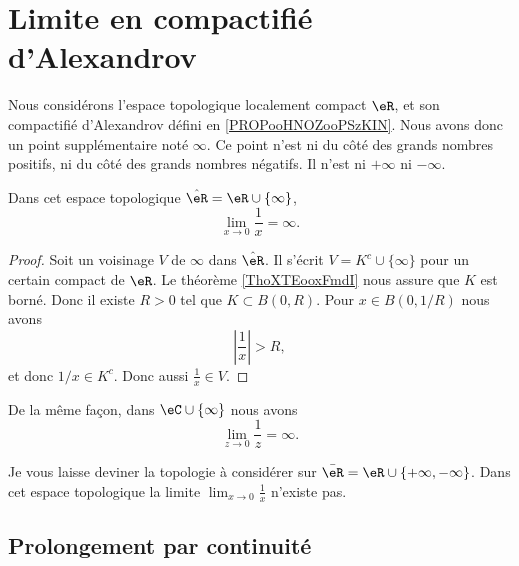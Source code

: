 \section{Limite en compactifié d'Alexandrov}

Nous considérons l'espace topologique localement compact \( \eR\), et son compactifié d'Alexandrov défini en \ref{PROPooHNOZooPSzKIN}. Nous avons donc un point supplémentaire noté \( \infty\). Ce point n'est ni du côté des grands nombres positifs, ni du côté des grands nombres négatifs. Il n'est ni \( +\infty\) ni \( -\infty\).

\begin{proposition}
	Dans cet espace topologique \( \hat \eR=\eR\cup\{ \infty \}\),
	\begin{equation}
		\lim_{x\to 0} \frac{1}{ x }=\infty.
	\end{equation}
\end{proposition}

\begin{proof}
	Soit un voisinage \( V\) de \( \infty\) dans \( \hat \eR\). Il s'écrit \( V=K^c\cup\{ \infty \}\) pour un certain compact de \( \eR\). Le théorème \ref{ThoXTEooxFmdI} nous assure que \( K\) est borné. Donc il existe \( R>0\) tel que \( K\subset B(0,R)\). Pour \( x\in B(0,1/R)\) nous avons
	\begin{equation}
		| \frac{1}{ x } |>R,
	\end{equation}
	et donc \( 1/x\in K^c\). Donc aussi \( \frac{1}{ x }\in V\).
\end{proof}

De la même façon, dans \( \eC\cup\{ \infty \}\) nous avons
\begin{equation}
	\lim_{z\to 0} \frac{1}{ z }=\infty.
\end{equation}

\begin{normaltext}
	Je vous laisse deviner la topologie à considérer sur \( \bar \eR=\eR\cup\{ +\infty,-\infty \}\). Dans cet espace topologique la limite \( \lim_{x\to 0} \frac{1}{ x }\) n'existe pas.
\end{normaltext}

\subsection{Prolongement par continuité}

